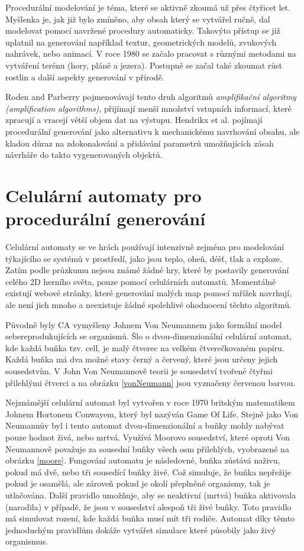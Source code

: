 Procedurální modelování je téma, které se aktivně zkoumá už přes čtyřicet let. Myšlenka je, jak již bylo zmíněno, aby obsah který se vytvářel ručně, dal modelovat pomocí navržené procedury automaticky. Takovýto přístup se již uplatnil na generování například textur, geometrických modelů, zvukových nahrávek, nebo animací. V roce 1980 se začalo pracovat s různými metodami na vytváření terénu (hory, pláně a jezera). Postupně se začal také zkoumat růst rostlin a další aspekty generování v přírodě. \cite{inproceedings}

Roden and Parberry \cite{FromArtistry} pojmenovávají tento druh algoritmů \textit{amplifikační algoritmy (amplification algorithms)}, přijímají menší množství vstupních informací, které zpracují a vracejí větší objem dat na výstupu. Hendrikx et al. \cite{Hendrikx} pojímají procedurální generování jako alternativu k mechanickému navrhování obsahu, ale kladou důraz na zdokonalování a přidávání parametrů umožňujících zásah návrháře do takto vygenerovaných objektů.

\section{Celulární automaty pro procedurální generování}
\label{celular}
Celulární automaty se ve hrách používají intenzivně zejména pro modelování týkajícího se systémů v prostředí, jako jsou teplo, oheň, déšť, tlak a exploze. Zatím podle průzkumu nejsou známé žádné hry, které by postavily generování celého 2D herního světa, pouze pomocí celulárních automatů. Momentálně existují webové stránky, které generování malých map pomocí mřížek navrhují, ale není jich mnoho a neexistuje žádné spolehlivé ohodnocení těchto algoritmů. \cite{articleCellular}

Původně byly CA vymyšleny Johnem Von Neumannem jako formální model sebereprodukujících se organismů. Šlo o dvou-dimenzionální celulární automat, kde každá buňka tzv. cell, je malý čtverec na velkém čtverečkovaném papíru. Každá buňka má dva možné stavy černý a červený, které jsou určeny jejich sousedstvím. V John Von Neumannově teorii je sousedství tvořené čtyřmi přilehlými čtverci a na obrázku \ref{vonNeumann} jsou vyznačeny červenou barvou. \cite{Gong2017}

Nejznámější celulární automat byl vytvořen v roce 1970 britským matematikem Johnem Hortonem Conwayem, který byl nazýván Game Of Life. Stejně jako Von Neumannův byl i tento automat dvou-dimenzionální a buňky mohly nabývat pouze hodnot živá, nebo mrtvá. Využívá Moorovo sousedství, které oproti Von Neumannově považuje za sousední buňky všech osm přilehlých, vyobrazené na obrázku \ref{moore}. Fungování automatu je následovné, buňka zůstává naživu, pokud má dvě, nebo tři sousedící buňky živé. Což simuluje, že buňka nepřežije pokud je osamělá, ale zároveň pokud je okolí přeplněné organismy, tak je utlačována. Další pravidlo umožňuje, aby se neaktivní (mrtvá) buňka aktivovala (narodila) v případě, že jsou v sousedství alespoň tři živé buňky. Toto pravidlo má simulovat rození, kde každá buňka musí mít tři rodiče. Automat díky těmto jednoduchým pravidlům dokáže vytvářet simulace které působily jako živý organismus. \cite{Gong2017}

